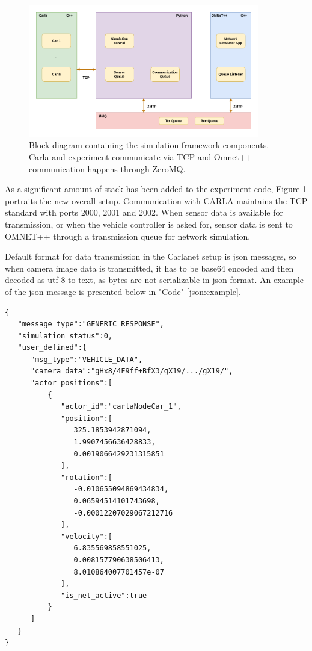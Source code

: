 \begin{figure} [!ht]
    \centering
    \includegraphics[width=0.9\textwidth]{parts/figuras/implementation-dissertacao.drawio.png}
    \caption{Block diagram containing the simulation framework components. Carla and experiment communicate via TCP and Omnet++ communication happens through ZeroMQ.}
    \label{fig:block-diagram}
\end{figure}

As a significant amount of stack has been added to the experiment code, Figure \ref{fig:block-diagram} portraits the new overall setup. Communication with CARLA maintains the TCP standard with ports 2000, 2001 and 2002. When sensor data is available for transmission, or when the vehicle controller is asked for, sensor data is sent to OMNET++ through a transmission queue for network simulation. 

Default format for data transmission in the Carlanet setup is json messages, so when camera image data is transmitted, it has to be base64 encoded and then decoded as utf-8 to text, as bytes are not serializable in json format. An example of the json message is presented below in "Code" \ref{json:example}.

\begin{lstlisting}[caption={json message example},label={json:example}]
{
   "message_type":"GENERIC_RESPONSE",
   "simulation_status":0,
   "user_defined":{
      "msg_type":"VEHICLE_DATA",
      "camera_data":"gHx8/4F9ff+BfX3/gX19/.../gX19/",
      "actor_positions":[
          {
             "actor_id":"carlaNodeCar_1",
             "position":[
                325.1853942871094,
                1.9907456636428833,
                0.0019066429231315851
             ],
             "rotation":[
                -0.010655094869434834,
                0.06594514101743698,
                -0.00012207029067212716
             ],
             "velocity":[
                6.835569858551025,
                0.008157790638506413,
                8.010864007701457e-07
             ],
             "is_net_active":true
          }
      ]
   }
}
\end{lstlisting}

